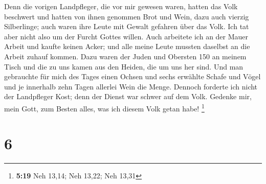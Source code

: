  Denn die vorigen Landpfleger, die vor mir gewesen waren,
hatten das Volk beschwert und hatten von ihnen genommen Brot und Wein,
dazu auch vierzig Silberlinge; auch waren ihre Leute mit Gewalt gefahren
über das Volk. Ich tat aber nicht also um der Furcht Gottes willen.
 Auch arbeitete ich an der Mauer Arbeit und kaufte keinen
Acker; und alle meine Leute mussten daselbst an die Arbeit zuhauf
kommen.  Dazu waren der Juden und Obersten 150 an meinem
Tisch und die zu uns kamen aus den Heiden, die um uns her sind.
 Und man gebrauchte für mich des Tages einen Ochsen und
sechs erwählte Schafe und Vögel und je innerhalb zehn Tagen allerlei
Wein die Menge. Dennoch forderte ich nicht der Landpfleger Kost; denn
der Dienst war schwer auf dem Volk.  Gedenke mir, mein
Gott, zum Besten alles, was ich diesem Volk getan habe! \footnote{\textbf{5:19}
  Neh 13,14; Neh 13,22; Neh 13,31}

\hypertarget{section-5}{%
\section{6}\label{section-5}}

